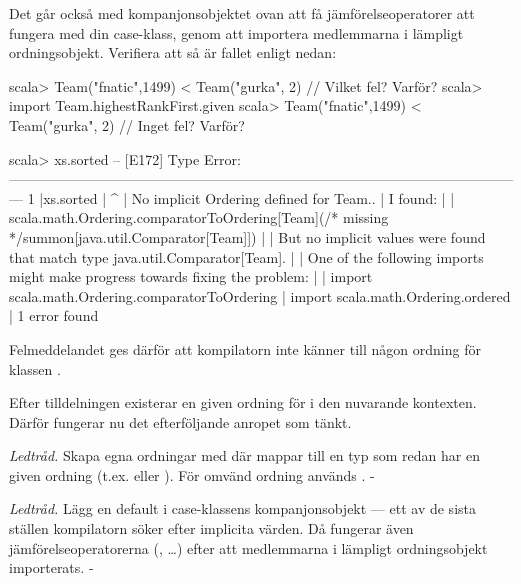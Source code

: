 \Subtask Det går också med kompanjonsobjektet ovan att få jämförelseoperatorer att fungera med din case-klass, genom att importera medlemmarna i lämpligt ordningsobjekt. Verifiera att så är fallet enligt nedan:
\begin{REPL}
scala> Team("fnatic",1499) < Team("gurka", 2)  // Vilket fel? Varför?
scala> import Team.highestRankFirst.given
scala> Team("fnatic",1499) < Team("gurka", 2)  // Inget fel? Varför?
\end{REPL}


\SOLUTION

\TaskSolved \what 

\SubtaskSolved
\begin{REPLnonum}
scala> xs.sorted
-- [E172] Type Error: ---------------------------------------------------------------------------------------------------------------
1 |xs.sorted
  |         ^
  | No implicit Ordering defined for Team..
  | I found:
  |
  |     scala.math.Ordering.comparatorToOrdering[Team](/* missing */summon[java.util.Comparator[Team]])
  |
  | But no implicit values were found that match type java.util.Comparator[Team].
  |
  | One of the following imports might make progress towards fixing the problem:
  |
  |     import scala.math.Ordering.comparatorToOrdering
  |     import scala.math.Ordering.ordered
  |
1 error found
\end{REPLnonum}
Felmeddelandet ges därför att kompilatorn inte känner till någon ordning för klassen . 

Efter tilldelningen  existerar en given ordning för  i den nuvarande kontexten. 
Därför fungerar nu det efterföljande anropet  som tänkt.

\SubtaskSolved
\emph{Ledtråd.} Skapa egna ordningar med  där  mappar till en typ  som redan har en given ordning (t.ex.  eller ). För omvänd ordning används .
-

\SubtaskSolved
\emph{Ledtråd.} Lägg en default  i case-klassens kompanjonsobjekt --- ett av de sista ställen kompilatorn söker efter implicita värden. Då fungerar även jämförelseoperatorerna (\code{<}, \code{>} \dots) efter att medlemmarna i lämpligt ordningsobjekt importerats.
-

